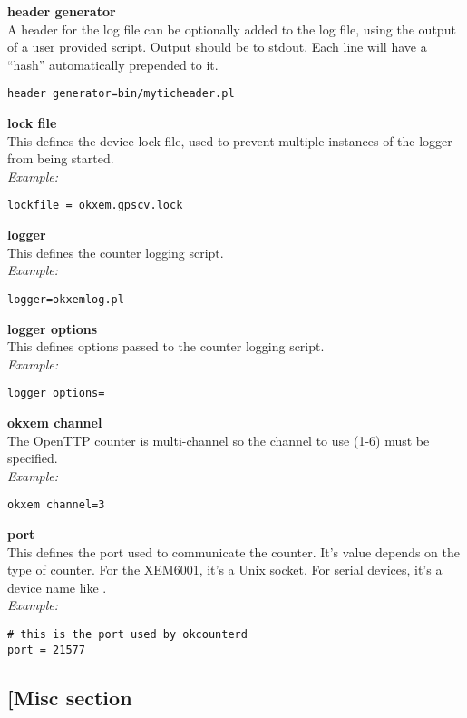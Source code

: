 {\bfseries header generator}\\
A header for the log file can be optionally added to the log file, using the output
of a user provided script. Output should be to stdout.
Each line will have a ``hash'' automatically prepended to it.\\
\begin{lstlisting}
header generator=bin/myticheader.pl
\end{lstlisting}

{\bfseries lock file}\\
This defines the device lock file, used to prevent multiple instances of the logger
from being started.\\
\textit{Example:}
\begin{lstlisting}
lockfile = okxem.gpscv.lock
\end{lstlisting}

{\bfseries logger}\\
This defines the counter logging script.\\
\textit{Example:}
\begin{lstlisting}
logger=okxemlog.pl
\end{lstlisting}

{\bfseries logger options}\\
This defines options passed to the counter logging script.\\
\textit{Example:}
\begin{lstlisting}
logger options=
\end{lstlisting}

{\bfseries okxem channel}\\
The OpenTTP counter is multi-channel so the channel to use (1-6) must be specified.\\
\textit{Example:}
\begin{lstlisting}
okxem channel=3
\end{lstlisting}

{\bfseries port}\\
This defines the port used to communicate the counter. It's value depends on the type of counter. 
For the XEM6001, it's a Unix socket. For serial devices, it's a device name like
.\\
\textit{Example:}
\begin{lstlisting}
# this is the port used by okcounterd
port = 21577 
\end{lstlisting}

\subsection{[Misc section}

